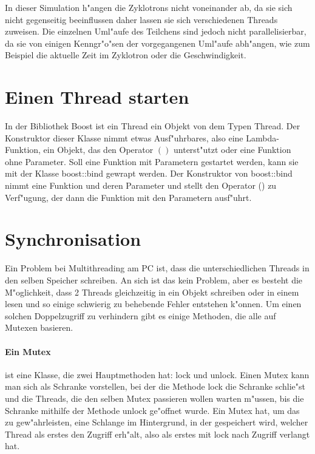 \documentclass[14pt, a4paper]{report}
\begin{document}
In dieser Simulation h"angen die Zyklotrons nicht voneinander ab, da sie sich nicht
gegenseitig beeinflussen daher lassen sie sich verschiedenen Threads zuweisen. Die
einzelnen Uml"aufe des Teilchens sind jedoch nicht parallelisierbar, da sie von einigen
Kenngr"o"sen der vorgegangenen Uml"aufe abh"angen, wie zum Beispiel die aktuelle Zeit 
im Zyklotron oder die Geschwindigkeit.

\section{Einen Thread starten}
In der Bibliothek Boost ist ein Thread ein Objekt von dem Typen Thread. Der
Konstruktor dieser Klasse nimmt etwas Ausf"uhrbares, also eine Lambda-Funktion,
ein Objekt, das den Operator $()$ unterst"utzt oder eine Funktion ohne Parameter.
Soll eine Funktion mit Parametern gestartet werden, kann sie mit der Klasse
boost::bind gewrapt werden. Der Konstruktor von boost::bind nimmt eine Funktion und deren
Parameter und stellt den Operator () zu Verf"ugung, der dann die Funktion mit den 
Parametern ausf"uhrt.

\section{Synchronisation} \label{Synchronisation}
Ein Problem bei Multithreading am PC ist, dass die unterschiedlichen Threads in den
selben Speicher schreiben. An sich ist das kein Problem, 
aber es besteht die M"oglichkeit,
dass 2 Threads gleichzeitig in ein Objekt schreiben oder in einem lesen und so einige
schwierig zu behebende Fehler entstehen k"onnen. Um einen solchen Doppelzugriff zu 
verhindern gibt es einige Methoden, die alle auf Mutexen basieren.

\paragraph{Ein Mutex} ist eine Klasse, die zwei Hauptmethoden hat: lock und unlock. Einen
Mutex kann man sich als Schranke vorstellen, bei der die Methode lock die Schranke schlie"st
und die Threads, die den selben Mutex passieren wollen warten m"ussen, bis die Schranke
mithilfe der Methode unlock ge"offnet wurde. Ein Mutex hat, um das zu gew"ahrleisten,
eine
Schlange im Hintergrund, in der gespeichert wird, welcher Thread als erstes den Zugriff
erh"alt, also als erstes mit lock nach Zugriff verlangt hat. 
\end{document}
